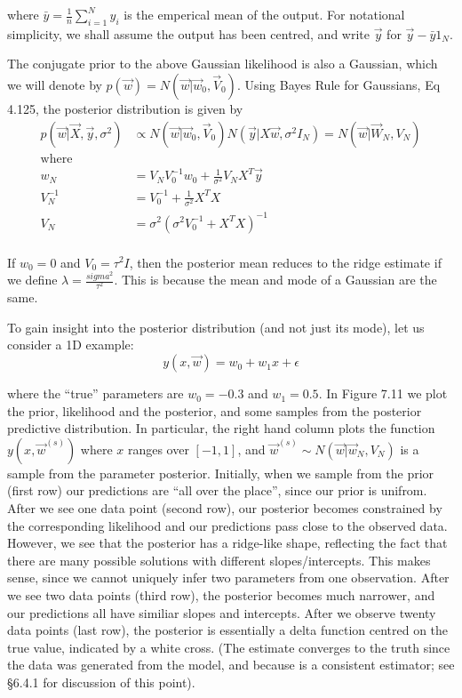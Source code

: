 \documentclass{amsart}
\begin{document}
where $\bar{y} = \frac{1}{n} \sum_{i=1}^N y_i$ is the emperical mean of the output. For
notational simplicity, we shall assume the output has been centred, and write $\vec{y}$ for
$\vec{y} - \bar{y} 1_N$.

The conjugate prior to the above Gaussian likelihood is also a Gaussian, which we will
denote by $p(\vec{w}) = N(\vec{w} | \vec{w}_0, \vec{V}_0)$. Using Bayes Rule for Gaussians,
Eq 4.125, the posterior distribution is given by
\begin{align*}
p(\vec{w}|\vec{X}, \vec{y}, \sigma^2) &\propto N(\vec{w}|\vec{w}_0, \vec{V}_0) N(\vec{y}|X \vec{w}, \sigma^2 I_N) = N(\vec{w}|\vec{W}_N, V_N) \\
\text{where}\\
w_N &= V_N V_0^{-1} w_0 + \frac{1}{\sigma^2} V_N X^T \vec{y} \\
V_N^{-1} &= V_0^{-1} + \frac{1}{\sigma^2} X^T X \\
V_N &= \sigma^2 (\sigma^2 V_0^{-1} + X^T X)^{-1} \\
\end{align*}

If $w_0 = 0$ and $V_0 = \tau^2 I$, then the posterior mean reduces to the ridge estimate
if we define $\lambda = \frac{sigma^2}{\tau^2}$. This is because the mean and mode of a 
Gaussian are the same.

To gain insight into the posterior distribution (and not just its mode), let us consider a
1D example:
\[
y(x, \vec{w}) = w_0 + w_1 x + \epsilon
\]

where the ``true'' parameters are $w_0 = -0.3$ and $w_1 = 0.5$. In Figure 7.11 we plot the
prior, likelihood and the posterior, and some samples from the posterior predictive
distribution. In particular, the right hand column plots the function $y(x, \vec{w}^{(s)})$
where $x$ ranges over $[-1, 1]$, and $\vec{w}^{(s)} \sim N(\vec{w} | \vec{w}_N, V_N)$ is a
sample from the parameter posterior. Initially, when we sample from the prior (first row)
our predictions are ``all over the place'', since our prior is unifrom. After we see one
data point (second row), our posterior becomes constrained by the corresponding likelihood
and our predictions pass close to the observed data. However, we see that the posterior has
a ridge-like shape, reflecting the fact that there are many possible solutions with
different slopes/intercepts. This makes sense, since we cannot uniquely infer two parameters
from one observation. After we see two data points (third row), the posterior becomes
much narrower, and our predictions all have similiar slopes and intercepts. After we observe
twenty data points (last row), the posterior is essentially a delta function centred on
the true value, indicated by a white cross. (The estimate converges to the truth since the data was generated from the model, and because is a consistent estimator; see \S 6.4.1
for discussion of this point).
\end{document}
